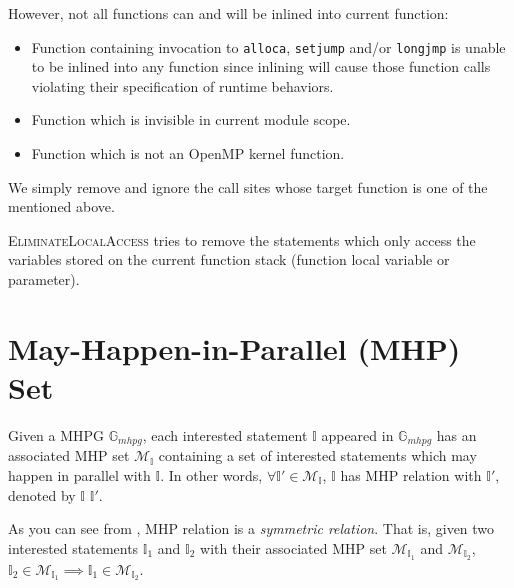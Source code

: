 However, not all functions can and will be inlined into current function:
\begin{itemize}
	\item Function containing invocation to \texttt{alloca}, \texttt{setjump} and/or \texttt{longjmp} is unable to be inlined into any function since inlining will cause those function calls violating their specification of runtime behaviors.
	\item Function which is invisible in current module scope.
	\item Function which is not an OpenMP kernel function.
\end{itemize}
We simply remove and ignore the call sites whose target function is one of the mentioned above.

\textsc{EliminateLocalAccess} tries to remove the statements which only access the variables stored on the current function stack (\ie function local variable or parameter).

\section{May-Happen-in-Parallel (MHP) Set}
\label{s:MHP-Set}

\begin{mydef}
\label{d:MHP-Set}
Given a MHPG $\mathbb{G}_{mhpg}$, each interested statement $\mathbb{I}$ appeared in $\mathbb{G}_{mhpg}$ has an associated MHP set $\mathcal{M}_\mathbb{I}$ containing a set of interested statements which may happen in parallel with $\mathbb{I}$. In other words, $\forall\mathbb{I}' \in \mathcal{M}_\mathbb{I}$, $\mathbb{I}$ has MHP relation with $\mathbb{I}'$, denoted by $\mathbb{I}$ \mhpr{} $\mathbb{I}'$.
\end{mydef}

As you can see from , MHP relation is a \textit{symmetric relation}. That is, given two interested statements $\mathbb{I}_1$ and $\mathbb{I}_2$ with their associated MHP set $\mathcal{M}_{\mathbb{I}_1}$ and $\mathcal{M}_{\mathbb{I}_2}$, $\mathbb{I}_2 \in \mathcal{M}_{\mathbb{I}_1} \implies \mathbb{I}_1 \in \mathcal{M}_{\mathbb{I}_2}$.

